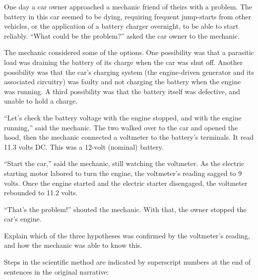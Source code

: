 \vskip 10pt {\narrower \noindent \baselineskip5pt

One day a car owner approached a mechanic friend of theirs with a problem.  The battery in this car seemed to be dying, requiring frequent jump-starts from other vehicles, or the application of a battery charger overnight, to be able to start reliably.  ``What could be the problem?'' asked the car owner to the mechanic.

\vskip 5pt

The mechanic considered some of the options.  One possibility was that a parasitic load was draining the battery of its charge when the car was shut off.  Another possibility was that the car's charging system (the engine-driven generator and its associated circuitry) was faulty and not charging the battery when the engine was running.  A third possibility was that the battery itself was defective, and unable to hold a charge.

\vskip 5pt

``Let's check the battery voltage with the engine stopped, and with the engine running,'' said the mechanic.  The two walked over to the car and opened the hood, then the mechanic connected a voltmeter to the battery's terminals.  It read 11.3 volts DC.  This was a 12-volt (nominal) battery.

\vskip 5pt

``Start the car,'' said the mechanic, still watching the voltmeter.  As the electric starting motor labored to turn the engine, the voltmeter's reading sagged to 9 volts.  Once the engine started and the electric starter disengaged, the voltmeter rebounded to 11.2 volts.

\vskip 5pt

``That's the problem!'' shouted the mechanic.  With that, the owner stopped the car's engine.

\par} \vskip 10pt

Explain which of the three hypotheses was confirmed by the voltmeter's reading, and how the mechanic was able to know this.







Steps in the scientific method are indicated by superscript numbers at the end of sentences in the original narrative:

